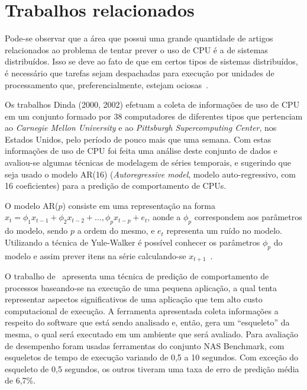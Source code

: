 %
%
\chapter{Trabalhos relacionados}

Pode-se observar que a área que possui uma grande quantidade de artigos
relacionados ao problema de tentar prever o uso de CPU é a de sistemas
distribuídos. Isso se deve ao fato de que em certos tipos de sistemas
distribuídos, é necessário que tarefas sejam despachadas para execução por
unidades de processamento que, preferencialmente, estejam ociosas~\cite{zhang2007cpu}.

Os trabalhos Dinda (2000, 2002)\nocite{dinda2000host}
\nocite{dinda2002evaluation} efetuam a coleta de informações de uso de
CPU em um conjunto formado por 38 computadores de diferentes tipos que
pertenciam ao \emph{Carnegie Mellon University} e ao \emph{Pittsburgh
Supercomputing Center}, nos Estados Unidos, pelo período de pouco mais que uma
semana. Com estas informações de uso de CPU foi feita uma análise deste conjunto
de dados e avaliou-se algumas técnicas de modelagem de séries temporais, e
sugerindo que seja usado o modelo AR(16) (\emph{Autoregressive model},
modelo auto-regressivo, com 16 coeficientes) para a predição de comportamento
de CPUs.

O modelo AR($p$) consiste em uma representação na forma
$x_t = \phi_{1}x_{t-1} + \phi_{2}x_{t-2}+\dotsc,\phi_{p}x_{t-p}+e_t$, aonde a
$\phi_p$ correspondem aos parâmetros do modelo, sendo $p$ a ordem do mesmo, e
$e_t$ representa um ruído no modelo. Utilizando a técnica de Yule-Walker é
possível conhecer os parâmetros $\phi_p$ do modelo e assim prever itens na
série calculando-se $x_{t+1}$~\cite{baddour2005autoregressive}.

O trabalho de~ apresenta uma técnica de
predição de comportamento de processos baseando-se na execução de uma pequena
aplicação, a qual tenta representar aspectos significativos de uma aplicação que
tem alto custo computacional de execução. A ferramenta apresentada coleta
informações a respeito do software que está sendo analisado e, então, gera um
“esqueleto” da mesma, o qual será executado em um ambiente que será
avaliado. Para avaliação de desempenho foram usadas ferramentas do conjunto NAS
Benchmark, com esqueletos de tempo de execução variando de 0,5 a 10 segundos.
Com exceção do esqueleto de 0,5 segundos, os outros tiveram uma taxa de erro de
predição média de 6,7\%. 

